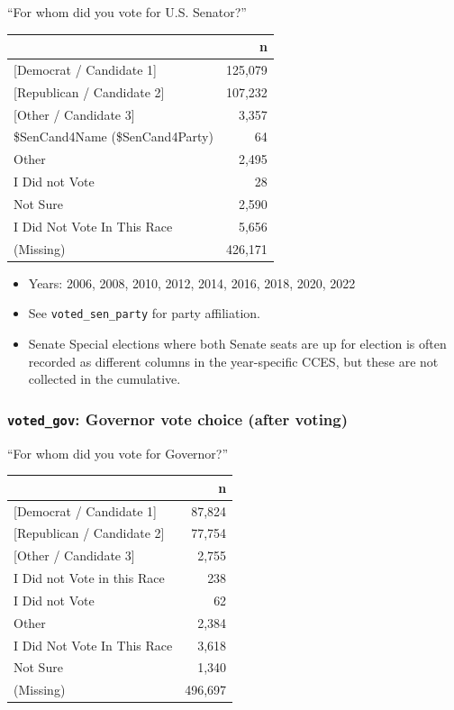 \documentclass[10pt,article,oneside]{memoir}
\theoremstyle{definition}
\begin{document}
``For whom did you vote for U.S. Senator?''

\begin{table}[H]
\centering
\begin{tabular}[t]{lr}
\toprule
 & n\\
\midrule
{}{[Democrat / Candidate 1]} & 125,079\\
{}{[Republican / Candidate 2]} & 107,232\\
{}{[Other / Candidate 3]} & 3,357\\
\$SenCand4Name (\$SenCand4Party) & 64\\
Other & 2,495\\
I Did not Vote & 28\\
Not Sure & 2,590\\
I Did Not Vote In This Race & 5,656\\
(Missing) & 426,171\\
\bottomrule
\end{tabular}
\end{table}

\begin{itemize}
\tightlist
\item
  Years: 2006, 2008, 2010, 2012, 2014, 2016, 2018, 2020, 2022
\item
  See \texttt{voted\_sen\_party} for party affiliation.
\item
  Senate Special elections where both Senate seats are up for election
  is often recorded as different columns in the year-specific CCES, but
  these are not collected in the cumulative.
\end{itemize}

\subsubsection{\texorpdfstring{\texttt{voted\_gov}: Governor vote choice
(after
voting)}{voted\_gov: Governor vote choice (after voting)}}\label{voted_gov-governor-vote-choice-after-voting}

``For whom did you vote for Governor?''

\begin{table}[H]
\centering
\begin{tabular}[t]{lr}
\toprule
 & n\\
\midrule
{}{[Democrat / Candidate 1]} & 87,824\\
{}{[Republican / Candidate 2]} & 77,754\\
{}{[Other / Candidate 3]} & 2,755\\
I Did not Vote in this Race & 238\\
I Did not Vote & 62\\
Other & 2,384\\
I Did Not Vote In This Race & 3,618\\
Not Sure & 1,340\\
(Missing) & 496,697\\
\bottomrule
\end{tabular}
\end{table}
\end{document}
